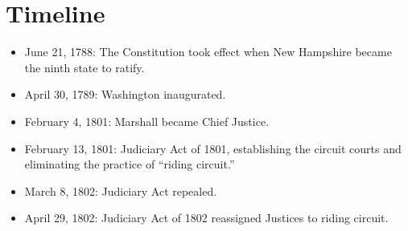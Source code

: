 \section{Timeline}

\begin{itemize}
    \item June 21, 1788: The Constitution took effect when New Hampshire 
    became the ninth state to ratify.
    \item April 30, 1789: Washington inaugurated.
    \item February 4, 1801: Marshall became Chief Justice.
    \item February 13, 1801: Judiciary Act of 1801, establishing the circuit 
    courts and eliminating the practice of ``riding circuit.''
    \item March 8, 1802: Judiciary Act repealed.
    \item April 29, 1802: Judiciary Act of 1802 reassigned Justices to riding 
    circuit.
\end{itemize}
